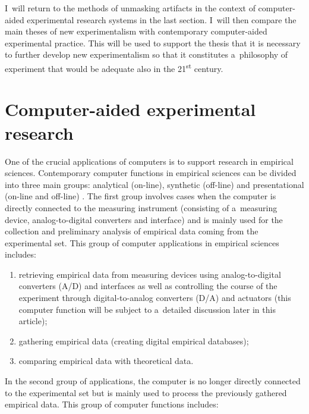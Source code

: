I~will return to the methods of unmasking artifacts in the context of computer-aided experimental research systems in the last section. I~will then compare the main theses of new experimentalism with contemporary computer-aided experimental practice. This will be used to support the thesis that it is necessary to further develop new experimentalism so that it constitutes a~philosophy of experiment that would be adequate also in the 21\textsuperscript{st} century.



\section{Computer-aided experimental research }

One of the crucial applications of computers is to support research in empirical sciences. Contemporary computer functions in empirical sciences can be divided into three main groups: analytical (on-line), synthetic (off-line) and presentational (on-line and off-line) 
\parencites[][]{leciejewski_preface_2019}[][]{leciejewski_struktura_2018}. %
 The first group involves cases when the computer is directly connected to the measuring instrument (consisting of a~measuring device, analog-to-digital converters and interface) and is mainly used for the collection and preliminary analysis of empirical data coming from the experimental set. This group of computer applications in empirical sciences includes:



\begin{enumerate}

\item retrieving empirical data from measuring devices using analog-to-digital converters (A/D) and interfaces as well as controlling the course of the experiment through digital-to-analog converters (D/A) and actuators (this computer function will be subject to a~detailed discussion later in this article);

\item gathering empirical data (creating digital empirical databases);

\item comparing empirical data with theoretical data.

\end{enumerate}

In the second group of applications, the computer is no longer directly connected to the experimental set but is mainly used to process the previously gathered empirical data. This group of computer functions includes:



